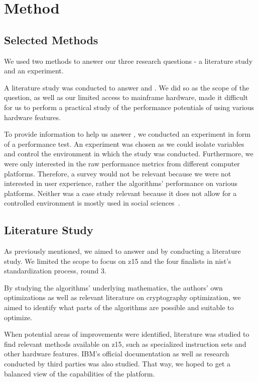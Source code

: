 \chapter{Method}
\label{chapter:method}

\section{Selected Methods}
\label{section:method:selected-method}

We used two methods to answer our three research questions - a literature study and an experiment.

A literature study was conducted to answer  and . We did so as the scope of the question, as well as our limited access to mainframe hardware, made it difficult for us to perform a practical study of the performance potentials of using various hardware features.

To provide information to help us answer , we conducted an experiment in form of a performance test. An experiment was chosen as we could isolate variables and control the environment in which the study was conducted. Furthermore, we were only interested in the raw performance metrics from different computer platforms. Therefore, a survey would not be relevant because we were not interested in user experience, rather the algorithms' performance on various platforms. Neither was a case study relevant because it does not allow for a controlled environment is mostly used in social sciences~\cite{wohlin2012}.

\section{Literature Study}
\label{section:method:literature-study}

As previously mentioned, we aimed to answer  and  by conducting a literature study. We limited the scope to focus on \gls{z15} and the four finalists in \gls{nist}'s standardization process, round 3.

By studying the algorithms' underlying mathematics, the authors' own optimizations as well as relevant literature on cryptography optimization, we aimed to identify what parts of the algorithms are possible and suitable to optimize.

When potential areas of improvements were identified, literature was studied to find relevant methods available on \gls{z15}, such as specialized instruction sets and other hardware features. IBM's official documentation as well as research conducted by third parties was also studied. That way, we hoped to get a balanced view of the capabilities of the platform.

